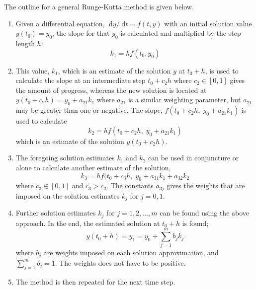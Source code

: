 \documentclass[a4paper,11pt]{article}
\newcommand{\diff}{\ensuremath{\; \text{d}}}
\begin{document}
The outline for a general Runge-Kutta method is given below.
\begin{enumerate}
    \item Given a differential equation, $\diff y/\diff t = f(t,y)$ with an initial solution value $y(t_0) = y_0$, the slope for that $y_0$ is calculated and multiplied by the step length $h$:
        \[ k_1 = h f(t_0, y_0) \]
    \item This value, $k_1$, which is an estimate of the solution $y$ at $t_0 + h$, is used to calculate the slope at an intermediate step $t_0 + c_2 h$ where $c_2 \in [0,1]$ gives the amount of progress, whereas the new solution is located at $y(t_0 + c_2 h) = y_0 + a_{21} k_1$ where $a_{21}$ is a similar weighting parameter, but $a_{21}$ may be greater than one or negative. The slope, $f(t_0+c_2 h, \; y_0 + a_{21} k_1)$ is used to calculate
        \[ k_2 = h f(t_0 + c_2 h, \; y_0 + a_{21} k_1) \]
        which is an estimate of the solution $y(t_0 + c_2 h)$.
    \item The foregoing solution estimates $k_1$ and $k_2$ can be used in conjuncture or alone to calculate another estimate of the solution,
        \[ k_3 = h f(t_0 + c_3 h, \; y_0 + a_{31} k_1 + a_{32} k_2 \]
        where $c_3 \in [0,1]$ and $c_3 > c_2$. The constants $a_{3j}$ gives the weights that are imposed on the solution estimates $k_j$ for $j=0,1$.
    \item Further solution estimates $k_j$ for $j=1,2,\dots,m$ can be found using the above approach. In the end, the estimated solution at $t_0 + h$ is found;
        \[ y (t_0 + h) = y_1 = y_0 + \sum_{j=1}^{m} b_j k_j \]
        where $b_j$ are weights imposed on each solution approximation, and $\sum_{j=1}^m b_j = 1$. The weights does not have to be positive.
    \item The method is then repeated for the next time step.
\end{enumerate}
\end{document}
